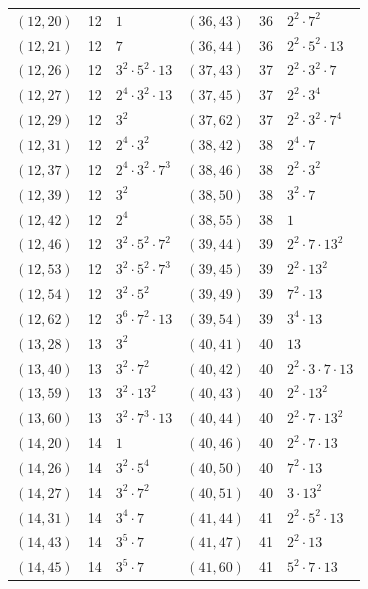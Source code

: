 \documentclass[11pt]{article}
\begin{document}
\begin{longtable}{@{}lrl@{\qquad}lrl@{}}
$(12,20)$ & 12 & $1$ & $(36,43)$ & 36 & $2^{2}\cdot 7^{2}$\\
$(12,21)$ & 12 & $7$ & $(36,44)$ & 36 & $2^{2}\cdot 5^{2}\cdot 13$\\
$(12,26)$ & 12 & $3^{2}\cdot 5^{2}\cdot 13$ & $(37,43)$ & 37 & $2^{2}\cdot 3^{2}\cdot 7$\\
$(12,27)$ & 12 & $2^{4}\cdot 3^{2}\cdot 13$ & $(37,45)$ & 37 & $2^{2}\cdot 3^{4}$\\
$(12,29)$ & 12 & $3^{2}$ & $(37,62)$ & 37 & $2^{2}\cdot 3^{2}\cdot 7^{4}$\\
$(12,31)$ & 12 & $2^{4}\cdot 3^{2}$ & $(38,42)$ & 38 & $2^{4}\cdot 7$\\
$(12,37)$ & 12 & $2^{4}\cdot 3^{2}\cdot 7^{3}$ & $(38,46)$ & 38 & $2^{2}\cdot 3^{2}$\\
$(12,39)$ & 12 & $3^{2}$ & $(38,50)$ & 38 & $3^{2}\cdot 7$\\
$(12,42)$ & 12 & $2^{4}$ & $(38,55)$ & 38 & $1$\\
$(12,46)$ & 12 & $3^{2}\cdot 5^{2}\cdot 7^{2}$ & $(39,44)$ & 39 & $2^{2}\cdot 7\cdot 13^{2}$\\
$(12,53)$ & 12 & $3^{2}\cdot 5^{2}\cdot 7^{3}$ & $(39,45)$ & 39 & $2^{2}\cdot 13^{2}$\\
$(12,54)$ & 12 & $3^{2}\cdot 5^{2}$ & $(39,49)$ & 39 & $7^{2}\cdot 13$\\
$(12,62)$ & 12 & $3^{6}\cdot 7^{2}\cdot 13$ & $(39,54)$ & 39 & $3^{4}\cdot 13$\\
$(13,28)$ & 13 & $3^{2}$ & $(40,41)$ & 40 & $13$\\
$(13,40)$ & 13 & $3^{2}\cdot 7^{2}$ & $(40,42)$ & 40 & $2^{2}\cdot 3\cdot 7\cdot 13$\\
$(13,59)$ & 13 & $3^{2}\cdot 13^{2}$ & $(40,43)$ & 40 & $2^{2}\cdot 13^{2}$\\
$(13,60)$ & 13 & $3^{2}\cdot 7^{3}\cdot 13$ & $(40,44)$ & 40 & $2^{2}\cdot 7\cdot 13^{2}$\\
$(14,20)$ & 14 & $1$ & $(40,46)$ & 40 & $2^{2}\cdot 7\cdot 13$\\
$(14,26)$ & 14 & $3^{2}\cdot 5^{4}$ & $(40,50)$ & 40 & $7^{2}\cdot 13$\\
$(14,27)$ & 14 & $3^{2}\cdot 7^{2}$ & $(40,51)$ & 40 & $3\cdot 13^{2}$\\
$(14,31)$ & 14 & $3^{4}\cdot 7$ & $(41,44)$ & 41 & $2^{2}\cdot 5^{2}\cdot 13$\\
$(14,43)$ & 14 & $3^{5}\cdot 7$ & $(41,47)$ & 41 & $2^{2}\cdot 13$\\
$(14,45)$ & 14 & $3^{5}\cdot 7$ & $(41,60)$ & 41 & $5^{2}\cdot 7\cdot 13$\\

\end{longtable}
\end{document}
